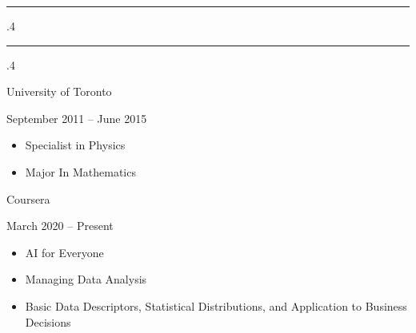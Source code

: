 \documentclass[10pt]{article}
\makeatletter
\newcommand*\rulefill[1][.4\p@]{%
    \leavevmode
    \leaders \hrule \@height #1\relax \hfill
    \null
  }
\makeatother
\begin{document}
\hspace{5mm}
\begin{minipage}[t]{0.325\linewidth}
\noindent
	\textcolor{black!20}{\rulefill\quad 
			{\fontsize{14}{25}\selectfont \textsl{}}
	\quad\rulefill}
\flushleft
\vspace{.15cm}




	{\fontsize{14}{20}\selectfont \textcolor{black!65}{
		University of Toronto
		}}

\vspace{.1cm}

	{\fontsize{10}{12}\selectfont 
		\textcolor{black!65}{
			September 2011 -- June 2015}}

\vspace{-0.75cm}

	{\fontsize{12}{16}\selectfont \textcolor{black!45}{
		\begin{justify}
		    \renewcommand{\labelitemi}{-}
		    \begin{itemize}[leftmargin=*]
		        \setlength\itemsep{-0.25em}
			    \item Specialist in Physics
			    \item Major In Mathematics
			\end{itemize}
		\end{justify}}}

\vspace{.25cm}
	{\fontsize{14}{20}\selectfont \textcolor{black!65}{
		Coursera
		}}

\vspace{.1cm}

	{\fontsize{10}{12}\selectfont 
		\textcolor{black!65}{
			March 2020 -- Present}}

\vspace{-0.75cm}

	{\fontsize{12}{16}\selectfont \textcolor{black!45}{
		\begin{justify}
		    \renewcommand{\labelitemi}{-}
		    \begin{itemize}[leftmargin=*]
		        \setlength\itemsep{-0.25em}
			    \item AI for Everyone
			    \item Managing Data Analysis
			    \item Basic Data Descriptors, Statistical Distributions, and Application to Business Decisions
			\end{itemize}
		\end{justify}}}


\end{minipage}
\end{document}
